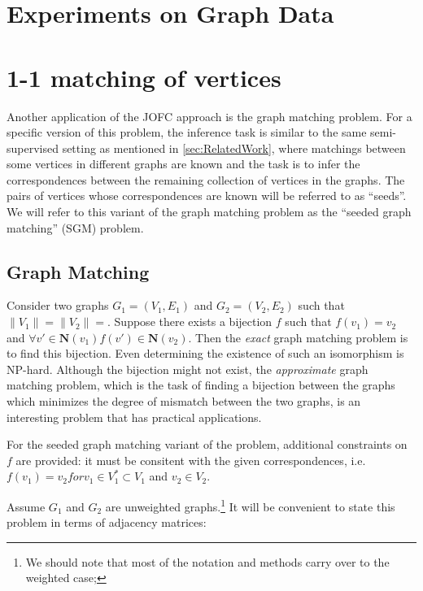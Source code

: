 \documentclass[12pt,oneside,final]{thesis}\usepackage[]{graphicx}\usepackage[]{color}
\begin{document}
\section{Experiments on Graph Data}


\section{1-1 matching of vertices}

Another application of  the JOFC approach is  the graph matching problem. For a specific version of this problem, the  inference task is similar to  the same semi-supervised setting as mentioned in \ref{sec:RelatedWork}, where matchings between some vertices in different graphs are known 
  and the task is to infer the correspondences between the remaining collection of vertices in the graphs.  The pairs of vertices whose correspondences are known will be referred to as ``seeds''. We will refer to this variant of the graph matching problem as the ``seeded graph matching'' (SGM) problem.
 
\subsection{Graph Matching }
Consider two  graphs $G_1=(V_1,E_1)$ and $G_2=(V_2,E_2)$ such that $\| V_1 \|=\| V_2 \|=$. Suppose there exists a bijection $f$   such that $f(v_1)=v_2$ and $\forall v' \in \mathbf{N}(v_1) f(v') \in \mathbf{N}(v_2)$. Then the \emph{exact} graph matching problem  is to find this bijection. Even determining the existence  of such an isomorphism is NP-hard.  Although the bijection might not exist,  the \emph{approximate} graph matching problem, which is the task of  finding a bijection between the
graphs which minimizes the degree  of mismatch   between the two graphs, is an interesting problem that has practical applications\cite{GraphMatchReview,Bengoetxea2002,recentdevGraphMatching2000,VogConGraphMatchFAQ,Zaslavskiy2009}.



For the seeded graph matching variant of the problem, additional constraints on $f$ are provided: it must be consitent with the given correspondences, i.e.  $f(v_1)=v_2 for v_1 \in V_1^{*} \subset V_1$ and $v_2 \in V_2$. 

Assume $G_1$ and $G_2$ are unweighted graphs.\footnote{We should note that most of the notation and methods carry over to the weighted case;} It will be convenient to state this problem in terms of adjacency matrices:
\end{document}
